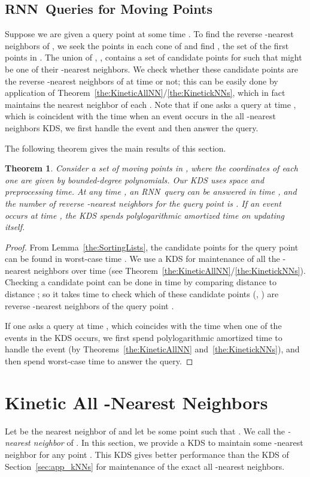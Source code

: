 \documentclass[preprint,12pt]{elsarticle}
\def\rknn{\mbox{RNN}}
\newtheorem{theorem}{Theorem}[section]
\begin{document}
\subsection{\rknn~Queries for Moving Points}
Suppose we are given a query point  at some time . To find the reverse -nearest neighbors of , we seek the points in each cone  of  and find , the set of the first  points in . The union of , , contains a set of candidate points for  such that  might be one of their -nearest neighbors. We check whether these candidate points are the reverse -nearest neighbors of  at time  or not; this can be easily done by application of Theorem~\ref{the:KineticAllNN}/\ref{the:KinetickNNs}, which in fact maintains the  nearest neighbor  of each . Note that if one asks a query at time , which is coincident with the time when an event occurs in the all -nearest neighbors KDS, we first handle the event and then answer the query. 

The following theorem gives the main results of this section.

\begin{theorem}\label{the:KineticRkNNQ}
Consider a set  of  moving points in , where the coordinates of each one are given by bounded-degree polynomials. Our KDS uses  space and  preprocessing time. At any time , an \rknn~query can be answered in time , and the number of reverse -nearest neighbors for the query point is . If an event occurs at time , the KDS spends polylogarithmic amortized time on updating itself.
\end{theorem}
\begin{proof}
From Lemma~\ref{the:SortingLists}, the  candidate points for the query point  can be found in worst-case time . We use a KDS for maintenance of all the -nearest neighbors over time (see  Theorem~\ref{the:KineticAllNN}/\ref{the:KinetickNNs}). Checking a candidate point can be done in  time by comparing distance  to distance ; so it takes  time to check which of these candidate points (, ) are reverse -nearest neighbors of the query point .

If one asks a query at time , which coincides with the time when one of the events in the KDS occurs, we first spend polylogarithmic amortized time to handle the event (by  Theorems~\ref{the:KineticAllNN} and~\ref{the:KinetickNNs}), and then spend worst-case time  to answer the query.
\end{proof}

\section{Kinetic All -Nearest Neighbors}\label{sec:KineticEpsANN}
Let  be the nearest neighbor of  and let  be some point such that . We call  the \textit{-nearest neighbor} of . In this section, we provide a KDS to maintain some -nearest neighbor for any point . This KDS gives better performance than the KDS of Section~\ref{sec:app_kNNs} for maintenance of the exact all -nearest neighbors.
\end{document}
